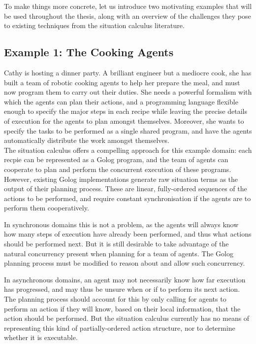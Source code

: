 To make things more concrete, let us introduce two motivating examples
that will be used throughout the thesis, along with an overview of
the challenges they pose to existing techniques from the situation
calculus literature.


\subsection*{Example 1: The Cooking Agents}

Cathy is hosting a dinner party. A brilliant engineer but a mediocre
cook, she has built a team of robotic cooking agents to help her prepare
the meal, and must now program them to carry out their duties. She
needs a powerful formalism with which the agents can plan their actions,
and a programming language flexible enough to specify the major steps
in each recipe while leaving the precise details of execution for
the agents to plan amongst themselves. Moreover, she wants to specify
the tasks to be performed as a single shared program, and have the
agents automatically distribute the work amongst themselves.\\


The situation calculus offers a compelling approach for this example
domain: each recpie can be represented as a Golog program, and the
team of agents can cooperate to plan and perform the concurrent execution
of these programs. However, existing Golog implementations generate
raw situation terms as the output of their planning process. These
are linear, fully-ordered sequences of the actions to be performed,
and require constant synchronisation if the agents are to perform
them cooperatively.

In synchronous domains this is not a problem, as the agents will always
know how many steps of execution have already been performed, and
thus what actions should be performed next. But it is still desirable
to take advantage of the natural concurrency present when planning
for a team of agents. The Golog planning process must be modified
to reason about and allow such concurrency.

In asynchronous domains, an agent may not necessarily know how far
execution has progressed, and may thus be unsure when or if to perform
its next action. The planning process should account for this by only
calling for agents to perform an action if they will know, based on
their local information, that the action should be performed. But
the situation calculus currently has no means of representing this
kind of partially-ordered action structure, nor to determine whether
it is executable.

